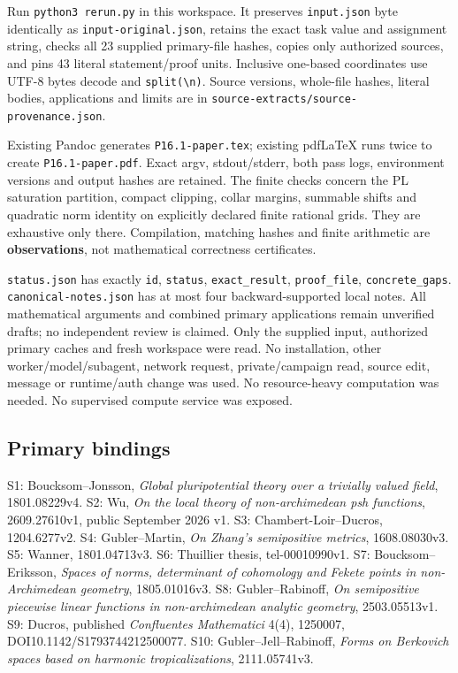 \documentclass[
  10pt,
]{article}
\begin{document}
Run \texttt{python3\ rerun.py} in this workspace. It preserves
\texttt{input.json} byte identically as \texttt{input-original.json},
retains the exact task value and assignment string, checks all 23
supplied primary-file hashes, copies only authorized sources, and pins
43 literal statement/proof units. Inclusive one-based coordinates use
UTF-8 bytes decode and
\texttt{split(\textquotesingle{}\textbackslash{}n\textquotesingle{})}.
Source versions, whole-file hashes, literal bodies, applications and
limits are in \texttt{source-extracts/source-provenance.json}.

Existing Pandoc generates \texttt{P16.1-paper.tex}; existing pdfLaTeX
runs twice to create \texttt{P16.1-paper.pdf}. Exact argv,
stdout/stderr, both pass logs, environment versions and output hashes
are retained. The finite checks concern the PL saturation partition,
compact clipping, collar margins, summable shifts and quadratic norm
identity on explicitly declared finite rational grids. They are
exhaustive only there. Compilation, matching hashes and finite
arithmetic are \textbf{observations}, not mathematical correctness
certificates.

\texttt{status.json} has exactly \texttt{id}, \texttt{status},
\texttt{exact\_result}, \texttt{proof\_file}, \texttt{concrete\_gaps}.
\texttt{canonical-notes.json} has at most four backward-supported local
notes. All mathematical arguments and combined primary applications
remain unverified drafts; no independent review is claimed. Only the
supplied input, authorized primary caches and fresh workspace were read.
No installation, other worker/model/subagent, network request,
private/campaign read, source edit, message or runtime/auth change was
used. No resource-heavy computation was needed. No supervised compute
service was exposed.

\subsection{Primary bindings}\label{primary-bindings}

S1: Boucksom--Jonsson, \emph{Global pluripotential theory over a
trivially valued field}, 1801.08229v4. S2: Wu, \emph{On the local theory
of non-archimedean psh functions}, 2609.27610v1, public September 2026
v1. S3: Chambert-Loir--Ducros, 1204.6277v2. S4: Gubler--Martin, \emph{On
Zhang's semipositive metrics}, 1608.08030v3. S5: Wanner, 1801.04713v3.
S6: Thuillier thesis, tel-00010990v1. S7: Boucksom--Eriksson,
\emph{Spaces of norms, determinant of cohomology and Fekete points in
non-Archimedean geometry}, 1805.01016v3. S8: Gubler--Rabinoff, \emph{On
semipositive piecewise linear functions in non-archimedean analytic
geometry}, 2503.05513v1. S9: Ducros, published \emph{Confluentes
Mathematici} 4(4), 1250007, DOI10.1142/S1793744212500077. S10:
Gubler--Jell--Rabinoff, \emph{Forms on Berkovich spaces based on
harmonic tropicalizations}, 2111.05741v3.
\end{document}
